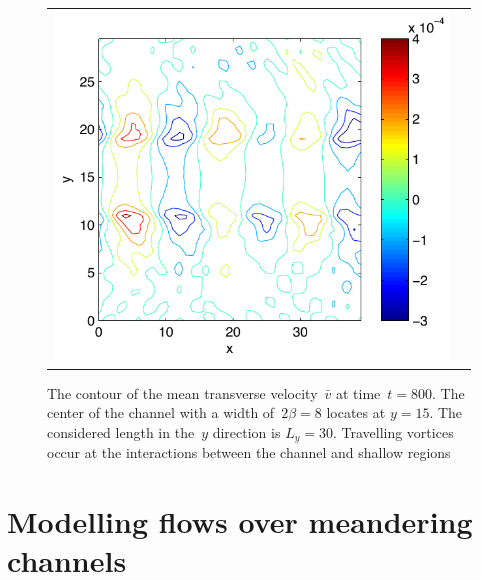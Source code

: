 \documentclass[12pt,a5paper]{article}
\newcommand{\vv}{{\bar v}}
\begin{document}
\begin{figure}
\centering
\begin{tabular}{c@{}c}
\includegraphics[width=\textwidth]{straight-v-bigs-cont}
\end{tabular}
\caption{The contour of the mean transverse velocity~$\vv$ at time~$t=800$. 
The center of the channel with a width of~$2\beta=8$ locates at $y=15$. 
The considered length in the~$y$ direction is $L_y=30$. 
Travelling vortices occur at the interactions between the channel and shallow regions}
\label{straight-v-bigs-cont}
\end{figure}%

\section{Modelling flows over meandering channels}
\label{sec-meander}
\end{document}
